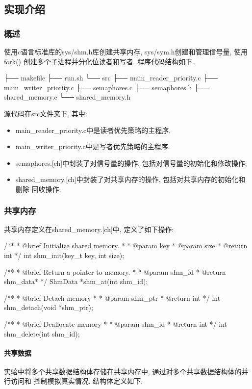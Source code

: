 \subsection{实现介绍}
\subsubsection{概述}
使用c语言标准库的sys/shm.h库创建共享内存, sys/sym.h创建和管理信号量, 使用fork()
创建多个子进程并分化位读者和写者. 程序代码结构如下.

\begin{code}
    ├── makefile
    ├── run.sh
    └── src
    ├── main_reader_priority.c
    ├── main_writer_priority.c
    ├── semaphores.c
    ├── semaphores.h
    ├── shared_memory.c
    └── shared_memory.h
\end{code}

源代码在src文件夹下, 其中:
\begin{itemize}
    \item main\_reader\_priority.c中是读者优先策略的主程序,
    \item main\_writer\_priority.c中是写者优先策略的主程序.
    \item semaphores.[ch]中封装了对信号量的操作, 包括对信号量的初始化和修改操作;
    \item shared\_memory.[ch]中封装了对共享内存的操作, 包括对共享内存的初始化和删除
          回收操作;
\end{itemize}

\subsubsection{共享内存}
共享内存定义在shared\_memory.[ch]中, 定义了如下操作:
\begin{code}
    /**
    * @brief Initialize shared memory.
    *
    * @param key
    * @param size
    * @return int
    */
    int shm_init(key_t key, int size);

    /**
    * @brief Return a pointer to memory.
    *
    * @param shm_id
    * @return shm_data*
    */
    ShmData *shm_at(int shm_id);

    /**
    * @brief Detach memory
    *
    * @param shm_ptr
    * @return int
    */
    int shm_detach(void *shm_ptr);

    /**
    * @brief Deallocate memory
    *
    * @param shm_id
    * @return int
    */
    int shm_delete(int shm_id);
\end{code}

\paragraph{共享数据}
实验中将多个共享数据结构体存储在共享内存中, 通过对多个共享数据结构体的并行访问和
控制模拟真实情况. 结构体定义如下.

